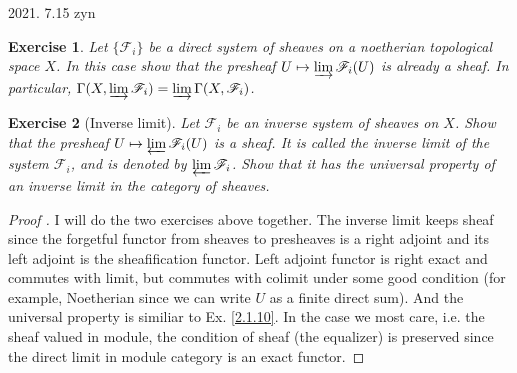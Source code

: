\documentclass{amsart}
\newtheorem{exe}{Exercise}[subsection]
\theoremstyle{remark}\newtheorem{rmk}[theorem]{Remark}
\begin{document}
2021. 7.15 zyn
\begin{exe}
Let $\lbrace \mathscr{F}_{i}   \rbrace$ be a direct system of sheaves on a noetherian topological space $X$.  In this case show that the presheaf  $U \mapsto \varinjlim\mathscr{F}_{i}(U)$ is already a sheaf.  In particular,  $\Gamma(X,\varinjlim{\mathscr{F}_{i}})=\varinjlim{\Gamma(X,\mathscr{F}_{i})}$.
\end{exe}
\begin{exe}[Inverse limit]
Let ${\mathscr{F}_{i}}$ be an inverse system of sheaves on $X$.  Show that the presheaf $U \mapsto \varprojlim\mathscr{F}_{i}(U)$ is a sheaf.  It is called the inverse limit of the system ${\mathscr{F}_{i}}$,  and is denoted by $\varprojlim\mathscr{F}_{i}$.  Show that it has the universal property of an inverse limit in the category of sheaves.
\end{exe}
\begin{proof}[Proof \footnotemark]
I will do the two exercises above together.  The inverse limit keeps sheaf since the forgetful functor from sheaves to presheaves is a right adjoint and its left adjoint is the sheafification functor.  Left adjoint functor is right exact and commutes with limit, but commutes with colimit under some good condition (for example,  Noetherian since we can write $U$ as a finite direct sum). And the universal property is similiar to Ex. \ref{2.1.10}.
In the case we most care,  i.e.  the sheaf valued in module,  the condition of sheaf (the equalizer) is preserved since the direct limit in module category is an exact functor.
\end{proof}
\end{document}
